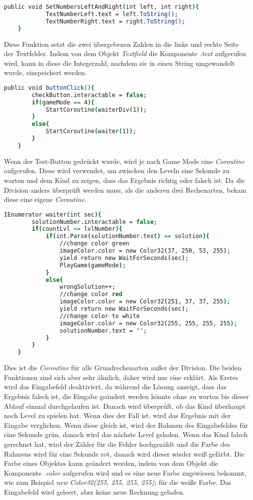 \begin{lstlisting}[language=csh, caption={MathOperations.cs SetTextLeftAndRight-Funktion}]
	public void SetNumbersLeftAndRight(int left, int right){
			TextNumberLeft.text = left.ToString();
			TextNumberRight.text = right.ToString();
	}
\end{lstlisting}
Diese Funktion setzt die zwei übergebenen Zahlen in die linke und rechte Seite der Textfelder. Indem von dem Objekt \textit{Textfield} die Komponente \textit{.text} aufgerufen wird, kann in diese die Integerzahl, nachdem sie in einen String umgewandelt wurde, einspeichert werden.\\
\begin{lstlisting}[language=csh, caption={MathOperations.cs ButtonClick-Funktion}]
	public void buttonClick(){
		checkButton.interactable = false;
		if(gameMode == 4){
			StartCoroutine(waiterDiv(1));
		}
		else{
			StartCoroutine(waiter(1));
		}
	}
\end{lstlisting}
Wenn der Test-Button gedrückt wurde, wird je nach Game Mode eine \textit{Coroutine} aufgerufen. Diese wird verwendet, um zwischen den Leveln eine Sekunde zu warten und dem Kind zu zeigen, dass das Ergebnis richtig oder falsch ist. Da die Division anders überprüft werden muss, als die anderen drei Rechenarten, bekam diese eine eigene \textit{Coroutine}.\\
\begin{lstlisting}[language=csh, caption={MathOperations.cs waiter-Coroutine}]
	IEnumerator waiter(int sec){
		solutionNumber.interactable = false;
		if(countLvl <= lvlNumber){
			if(int.Parse(solutionNumber.text) == solution){
				//change color green
				imageColor.color = new Color32(37, 250, 53, 255);
				yield return new WaitForSeconds(sec);
				PlayGame(gameMode);
			}
			else{
				wrongSolution++;
				//change color red
				imageColor.color = new Color32(251, 37, 37, 255);
				yield return new WaitForSeconds(sec);
				//change color to white
				imageColor.color = new Color32(255, 255, 255, 255);
				solutionNumber.text = "";
			}
		}
	}
\end{lstlisting}
Dies ist die \textit{Coroutine} für alle Grundrechenarten außer der Division. Die beiden Funktionen sind sich aber sehr ähnlich, daher wird nur eine erklärt. Als Erstes wird das Eingabefeld deaktiviert, da während die Lösung anzeigt, dass das Ergebnis falsch ist, die Eingabe geändert werden könnte ohne zu warten bis dieser Ablauf einmal durchgelaufen ist. Danach wird überprüft, ob das Kind überhaupt noch Level zu spielen hat. Wenn dies der Fall ist, wird das Ergebnis mit der Eingabe verglichen. Wenn diese gleich ist, wird der Rahmen des Eingabefeldes für eine Sekunde grün, danach wird das nächste Level geladen. Wenn das Kind falsch gerechnet hat, wird der Zähler für die Fehler hochgezählt und die Farbe des Rahmens wird für eine Sekunde rot, danach wird dieser wieder weiß gefärbt. Die Farbe eines Objektes kann geändert werden, indem von dem Objekt die Komponente \textit{.color} aufgerufen wird und es eine neue Farbe zugewiesen bekommt, wie zum Beispiel \textit{new Color32(255, 255, 255, 255);} für die weiße Farbe. Das Eingabefeld wird geleert, aber keine neue Rechnung geladen.\\
